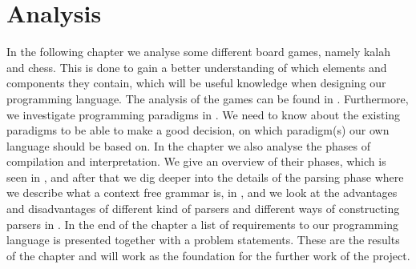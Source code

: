 \chapter{Analysis}
\label{chap:analysis}
In the following chapter we analyse some different board games, namely kalah and chess. This is done to gain a better understanding of which elements and components they contain, which will be useful knowledge when designing our programming language. The analysis of the games can be found in . Furthermore, we investigate programming paradigms in . We need to know about the existing paradigms to be able to make a good decision, on which paradigm(s) our own language should be based on. In the chapter we also analyse the phases of compilation and interpretation. We give an overview of their phases, which is seen in , and after that we dig deeper into the details of the parsing phase where we describe what a context free grammar is, in , and we look at the advantages and disadvantages of different kind of parsers and different ways of constructing parsers in . In the end of the chapter a list of requirements to our programming language is presented together with a problem statements. These are the results of the chapter and will work as the foundation for the further work of the project.




%
%
%
%
%





